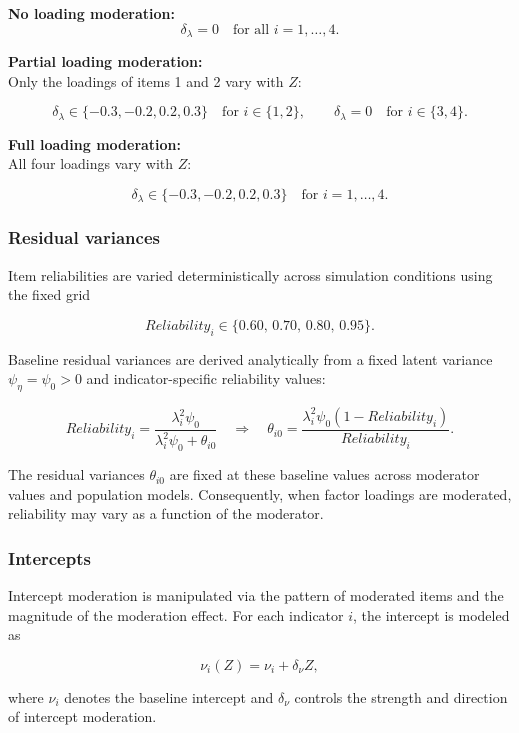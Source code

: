 \documentclass[
  man,
  floatsintext]{apa7}
\begin{document}
\textbf{No loading moderation:}\\
\[
\delta_{\lambda}=0 \quad \text{for all } i=1,\dots,4.
\]

\textbf{Partial loading moderation:}\\
Only the loadings of items 1 and 2 vary with \(Z\):

\[
\delta_{\lambda} \in \{-0.3,-0.2,0.2,0.3\}
\quad \text{for } i \in \{1,2\},
\qquad
\delta_{\lambda}=0
\quad \text{for } i \in \{3,4\}.
\]

\textbf{Full loading moderation:}\\
All four loadings vary with \(Z\):

\[
\delta_{\lambda} \in \{-0.3,-0.2,0.2,0.3\}
\quad \text{for } i=1,\dots,4.
\]

\subsubsection{Residual variances}\label{residual-variances}

Item reliabilities are varied deterministically across simulation
conditions using the fixed grid

\[
Reliability_i \in \{0.60,\,0.70,\,0.80,\,0.95\}.
\]

Baseline residual variances are derived analytically from a fixed latent
variance \(\psi_\eta=\psi_0>0\) and indicator-specific reliability
values:

\[
Reliability_i=\frac{\lambda_i^2 \psi_0}{\lambda_i^2 \psi_0 + \theta_{i0}}
\quad \Rightarrow \quad
\theta_{i0}=
\frac{\lambda_i^2 \psi_0(1-{Reliability}_i)}
{{Reliability}_i}.
\]

The residual variances \(\theta_{i0}\) are fixed at these baseline
values across moderator values and population models. Consequently, when
factor loadings are moderated, reliability may vary as a function of the
moderator.

\subsubsection{Intercepts}\label{intercepts}

Intercept moderation is manipulated via the pattern of moderated items
and the magnitude of the moderation effect. For each indicator \(i\),
the intercept is modeled as

\[
\nu_i(Z) = \nu_i + \delta_{\nu} Z,
\]

where \(\nu_i\) denotes the baseline intercept and \(\delta_{\nu}\)
controls the strength and direction of intercept moderation.
\end{document}
